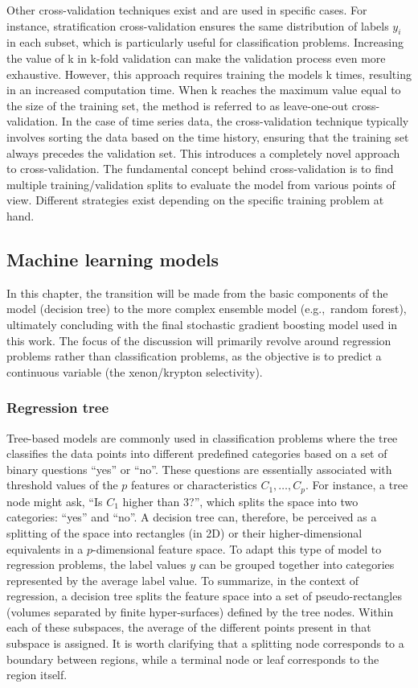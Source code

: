 \documentclass[main]{subfiles}
\begin{document}
Other cross-validation techniques exist and are used in specific cases. For instance, stratification cross-validation ensures the same distribution of labels $y_i$ in each subset, which is particularly useful for classification problems. Increasing the value of k in  k-fold validation can make the validation process even more exhaustive. However, this approach requires training the models k times, resulting in an increased computation time. When k reaches the maximum value equal to the size of the training set, the method is referred to as leave-one-out cross-validation. In the case of time series data, the cross-validation technique typically involves sorting the data based on the time history, ensuring that the training set always precedes the validation set. This introduces a completely novel approach to cross-validation. The fundamental concept behind cross-validation is to find multiple training/validation splits to evaluate the model from various points of view. Different strategies exist depending on the specific training problem at hand.

\subsection{Machine learning models}\label{sct:model}

In this chapter, the transition will be made from the basic components of the model (decision tree) to the more complex ensemble model (e.g.,\ random forest), ultimately concluding with the final stochastic gradient boosting model used in this work. The focus of the discussion will primarily revolve around regression problems rather than classification problems, as the objective is to predict a continuous variable (the xenon/krypton selectivity).

\subsubsection{Regression tree}

Tree-based models are commonly used in classification problems where the tree classifies the data points into different predefined categories based on a set of binary questions ``yes'' or ``no''. These questions are essentially associated with threshold values of the $p$ features or characteristics $C_1,\ldots,C_p$. For instance, a tree node might ask, ``Is $C_1$ higher than $3$?'', which splits the space into two categories: ``yes'' and ``no''. A decision tree can, therefore, be perceived as a splitting of the space into rectangles (in 2D) or their higher-dimensional equivalents in a $p$-dimensional feature space. To adapt this type of model to regression problems, the label values $y$ can be grouped together into categories represented by the average label value. To summarize, in the context of regression, a decision tree splits the feature space into a set of pseudo-rectangles (volumes separated by finite hyper-surfaces) defined by the tree nodes. Within each of these subspaces, the average of the different points present in that subspace is assigned. It is worth clarifying that a splitting node corresponds to a boundary between regions, while a terminal node or leaf corresponds to the region itself.
\end{document}

